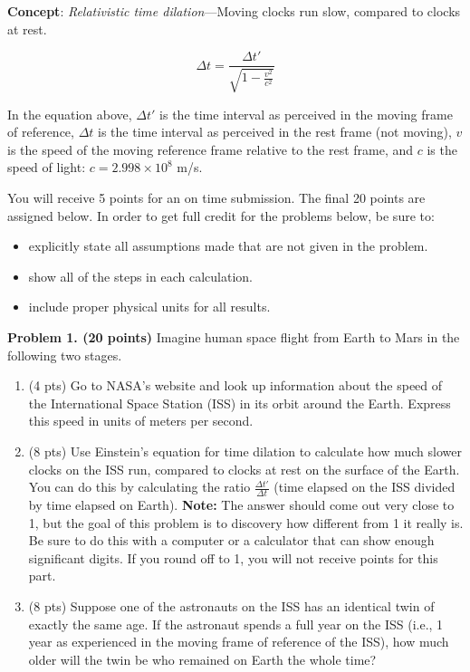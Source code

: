 \documentclass[12pt]{article}
\begin{document}
\vspace{1cm}

\noindent \textbf{Concept}: \textit{Relativistic time dilation}—Moving clocks
run slow, compared to clocks at rest.

\[
\Delta t = \frac{\Delta t'}{\sqrt{1 - \frac{v^2}{c^2}}}
\]

\noindent In the equation above, $\Delta t'$ is the time interval as perceived
in the moving frame of reference, $\Delta t$ is the time interval as perceived
in the rest frame (not moving), $v$ is the speed of the moving reference frame
relative to the rest frame, and $c$ is the speed of light: $c = 2.998 \times
10^8$ m/s.

\vspace{0.5cm}

\noindent You will receive 5 points for an on time submission. The final 20
points are assigned below. In order to get full credit for the problems below,
be sure to:
\begin{itemize}
    \item explicitly state all assumptions made that are not given in the
    problem.
    \vspace{-10pt}
    \item show all of the steps in each calculation.
    \vspace{-10pt}
    \item include proper physical units for all results.
\end{itemize}

\vspace{10pt}
\noindent \textbf{Problem 1. (20 points)} Imagine human space flight from Earth
to Mars in the following two stages.

\begin{enumerate}
    \item (4 pts) Go to NASA's website and look up information about the speed
    of the International Space Station (ISS) in its orbit around the Earth.
    Express this speed in units of meters per second.

    \item (8 pts) Use Einstein's equation for time dilation to calculate how
    much slower clocks on the ISS run, compared to clocks at rest on the surface
    of the Earth. You can do this by calculating the ratio $\frac{\Delta
    t'}{\Delta t}$ (time elapsed on the ISS divided by time elapsed on Earth).
    \textbf{Note:} The answer should come out very close to 1, but the goal of
    this problem is to discovery how different from 1 it really is. Be sure to
    do this with a computer or a calculator that can show enough significant
    digits. If you round off to 1, you will not receive points for this part. 

    \item (8 pts) Suppose one of the astronauts on the ISS has an identical twin
    of exactly the same age. If the astronaut spends a full year on the ISS
    (i.e., 1 year as experienced in the moving frame of reference of the ISS),
    how much older will the twin be who remained on Earth the whole time? 
\end{enumerate}
\end{document}
